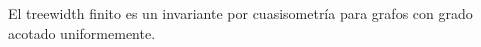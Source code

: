 \documentclass[tesis.tex]{subfiles}
\begin{document}
\begin{prop} \label{treewidth-inv}
	El treewidth finito es un invariante por cuasisometría para grafos con grado acotado uniformemente.
\end{prop}
%
%
%
\end{document}
